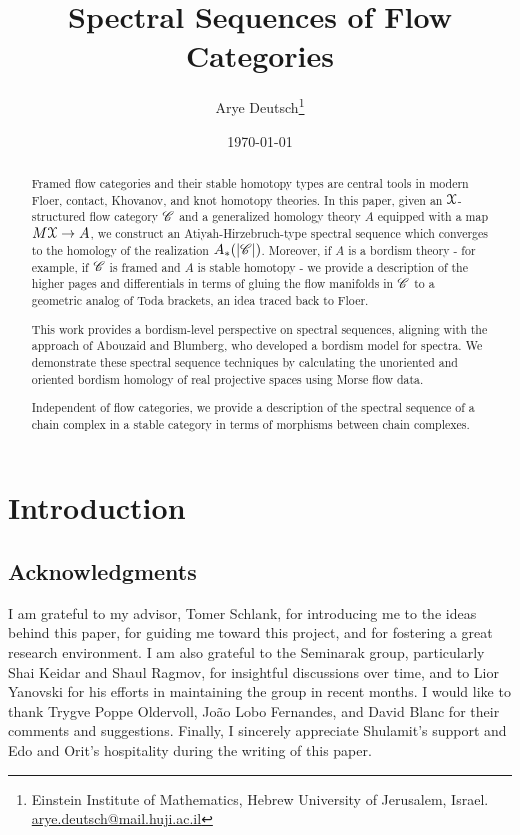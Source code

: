 \documentclass[a4paper,11pt]{article}
\date{\today}
\author{Arye Deutsch\thanks{Einstein Institute of Mathematics, Hebrew University of Jerusalem, Israel. \url{ arye.deutsch@mail.huji.ac.il}}}
\theoremstyle{plain}
\theoremstyle{definition}
\theoremstyle{remark}
\begin{document}
\title{Spectral Sequences of Flow Categories}
\maketitle

\begin{abstract}
    Framed flow categories and their stable homotopy types are central tools in modern Floer, contact, Khovanov, and knot homotopy theories. In this paper, given an $\EuScript{X}$-structured flow category $\mathscr{C}$ and a generalized homology theory $A$ equipped with a map $M\EuScript{X} \to A$, we construct an Atiyah-Hirzebruch-type spectral sequence which converges to the homology of the realization $A_*(\left\lvert\mathscr{C}\right\rvert)$. Moreover, if $A$ is a bordism theory - for example, if $\mathscr{C}$ is framed and $A$ is stable homotopy - we provide a description of the higher pages and differentials in terms of gluing the flow manifolds in $\mathscr{C}$ to a geometric analog of Toda brackets, an idea traced back to Floer\cite{floer1989witten}.

    This work provides a bordism-level perspective on spectral sequences, aligning with the approach of Abouzaid and Blumberg, who developed a bordism model for spectra. We demonstrate these spectral sequence techniques by calculating the unoriented and oriented bordism homology of real projective spaces using Morse flow data.

    Independent of flow categories, we provide a description of the spectral sequence of a chain complex in a stable category in terms of morphisms between chain complexes.
\end{abstract}
\newpage

\tableofcontents
\newpage

\section{Introduction}\label{sec:intro}


\subsection*{Acknowledgments}
I am grateful to my advisor, Tomer Schlank, for introducing me to the ideas behind this paper, for guiding me toward this project, and for fostering a great research environment. I am also grateful to the Seminarak group, particularly Shai Keidar and Shaul Ragmov, for insightful discussions over time, and to Lior Yanovski for his efforts in maintaining the group in recent months. I would like to thank Trygve Poppe Oldervoll, João Lobo Fernandes, and David Blanc for their comments and suggestions. Finally, I sincerely appreciate Shulamit's support and Edo and Orit's hospitality during the writing of this paper.
\end{document}
